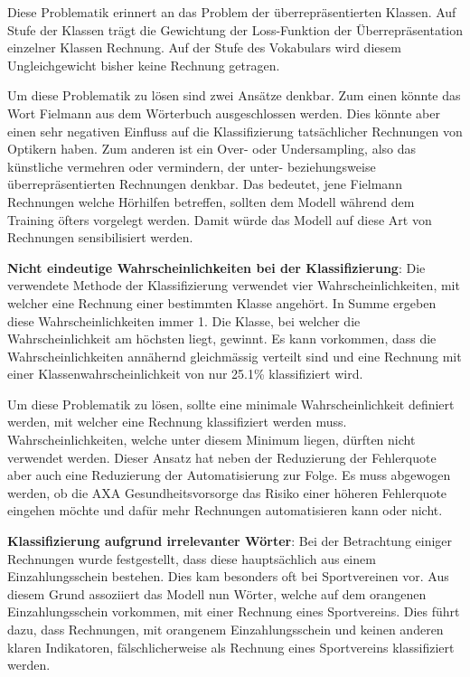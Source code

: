 Diese Problematik erinnert an das Problem der überrepräsentierten Klassen. Auf Stufe der Klassen trägt die Gewichtung der Loss-Funktion der Überrepräsentation einzelner Klassen Rechnung. Auf der Stufe des Vokabulars wird diesem Ungleichgewicht bisher keine Rechnung getragen.

Um diese Problematik zu lösen sind zwei Ansätze denkbar. Zum einen könnte das Wort Fielmann aus dem Wörterbuch ausgeschlossen werden. Dies könnte aber einen sehr negativen Einfluss auf die Klassifizierung tatsächlicher Rechnungen von Optikern haben. Zum anderen ist ein Over- oder Undersampling, also das künstliche vermehren oder vermindern, der unter- beziehungsweise überrepräsentierten Rechnungen denkbar. Das bedeutet, jene Fielmann Rechnungen welche Hörhilfen betreffen, sollten dem Modell während dem Training öfters vorgelegt werden. Damit würde das Modell auf diese Art von Rechnungen sensibilisiert werden.


\textbf{Nicht eindeutige Wahrscheinlichkeiten bei der Klassifizierung}: Die verwendete Methode der Klassifizierung verwendet vier Wahrscheinlichkeiten, mit welcher eine Rechnung einer bestimmten Klasse angehört. In Summe ergeben diese Wahrscheinlichkeiten immer 1. Die Klasse, bei welcher die Wahrscheinlichkeit am höchsten liegt, gewinnt. Es kann vorkommen, dass die Wahrscheinlichkeiten annähernd gleichmässig verteilt sind und eine Rechnung mit einer Klassenwahrscheinlichkeit von nur 25.1\% klassifiziert wird.

Um diese Problematik zu lösen, sollte eine minimale Wahrscheinlichkeit definiert werden, mit welcher eine Rechnung klassifiziert werden muss. Wahrscheinlichkeiten, welche unter diesem Minimum liegen, dürften nicht verwendet werden. Dieser Ansatz hat neben der Reduzierung der Fehlerquote aber auch eine Reduzierung der Automatisierung zur Folge. Es muss abgewogen werden, ob die AXA Gesundheitsvorsorge das Risiko einer höheren Fehlerquote eingehen möchte und dafür mehr Rechnungen automatisieren kann oder nicht.


\textbf{Klassifizierung aufgrund irrelevanter Wörter}: Bei der Betrachtung einiger Rechnungen wurde festgestellt, dass diese hauptsächlich aus einem Einzahlungsschein bestehen. Dies kam besonders oft bei Sportvereinen vor. Aus diesem Grund assoziiert das Modell nun Wörter, welche auf dem orangenen Einzahlungsschein vorkommen, mit einer Rechnung eines Sportvereins. Dies führt dazu, dass Rechnungen, mit orangenem Einzahlungsschein und keinen anderen klaren Indikatoren, fälschlicherweise als Rechnung eines Sportvereins klassifiziert werden.

